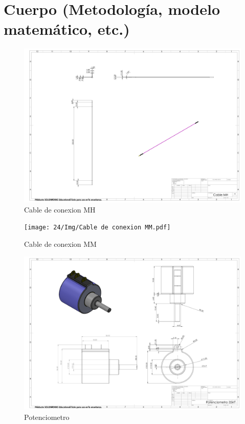     \section{Cuerpo (Metodología, modelo matemático, etc.)}
    \begin{figure}[H]
        \centering
        \includegraphics[trim = {10mm 10mm 10mm 10mm},clip,scale=0.120]{24/Img/cabledeConexionmh.PDF}
        \caption{Cable de conexion MH}
        \label{fig:Cable de conexion MH}
    \end{figure}
    \begin{figure}[H]
        \centering
        \texttt{[image: 24/Img/Cable de conexion MM.pdf]}
        \caption{Cable de conexion MM}
        \label{fig:Cable de conexion MM}
    \end{figure}
    \begin{figure}[H]
        \centering
        \includegraphics[trim = {10mm 10mm 10mm 10mm},clip,scale=0.120]{24/Img/Potenciometro.pdf}
        \caption{Potenciometro}
        \label{fig:Potenciometro}
    \end{figure}
